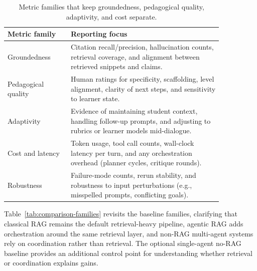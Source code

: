 \begin{table}[t]
\centering
\small
\begin{tabular}{p{0.25\linewidth}p{0.6\linewidth}}
\toprule
Metric family & Reporting focus \\
\midrule
Groundedness & Citation recall/precision, hallucination counts, retrieval coverage, and alignment between retrieved snippets and claims. \\
Pedagogical quality & Human ratings for specificity, scaffolding, level alignment, clarity of next steps, and sensitivity to learner state. \\
Adaptivity & Evidence of maintaining student context, handling follow-up prompts, and adjusting to rubrics or learner models mid-dialogue. \\
Cost and latency & Token usage, tool call counts, wall-clock latency per turn, and any orchestration overhead (planner cycles, critique rounds). \\
Robustness & Failure-mode counts, rerun stability, and robustness to input perturbations (e.g., misspelled prompts, conflicting goals). \\
\bottomrule
\end{tabular}
\caption{Metric families that keep groundedness, pedagogical quality, adaptivity, and cost separate.}
\label{tab:metric-families}
\end{table}

Table~\ref{tab:comparison-families} revisits the baseline families, clarifying that classical RAG remains the default retrieval-heavy pipeline, agentic RAG adds orchestration around the same retrieval layer, and non-RAG multi-agent systems rely on coordination rather than retrieval. The optional single-agent no-RAG baseline provides an additional control point for understanding whether retrieval or coordination explains gains.

